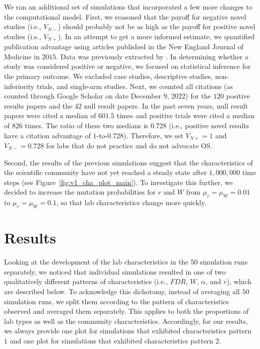 \documentclass[meta, authordate]{jote-new-article}
\begin{document}
We ran an additional set of simulations that incorporated a few more changes to the computational model. First, we reasoned that the payoff for negative novel studies (i.e., $V_{N-}$) should probably not be as high as the payoff for positive novel studies (i.e., $V_{N+}$). In an attempt to get a more informed estimate, we quantified publication advantage using articles published in the New England Journal of Medicine in $2015$. Data was previously extracted by \textcite{HoekstraMondenVanravenzwaaij_2018}. In determining whether a study was considered positive or negative, we focused on statistical inference for the primary outcome. We excluded case studies, descriptive studies, non-inferiority trials, and single-arm studies. Next, we counted all citations (as counted through Google Scholar on date December 9, 2022) for the $120$ positive results papers and the $42$ null result papers. In the past seven years, null result papers were cited a median of $601.5$ times and positive trials were cited a median of $826$ times. The ratio of these two medians is $0.728$ (i.e., positive novel results have a citation advantage of $1$-to-$0.728$). Therefore, we set $V_{N+}=1$ and $V_{N-}=0.728$ for labs that do not practice and do not advocate OS.

Second, the results of the previous simulations suggest that the characteristics of the scientific community have not yet reached a steady state after $1,000,000$ time steps (see Figure~\ref{fig:v1_cha_plot_main}). To investigate this further, we decided to increase the mutation probabilities for $r$ and $W$ from $\mu_r=\mu_W=0.01$ to $\mu_r=\mu_W=0.1$, so that lab characteristics change more quickly.

\section{Results}

Looking at the development of the lab characteristics in the $50$ simulation runs separately, we noticed that individual simulations resulted in one of two qualitatively different patterns of characteristics (i.e., $FDR$, $W$, $\alpha$, and $r$), which are described below. To acknowledge this dichotomy, instead of averaging all $50$ simulation runs, we split them according to the pattern of characteristics observed and averaged them separately. This applies to both the proportions of lab types as well as the community characteristics. Accordingly, for our results, we always provide one plot for simulations that exhibited characteristics pattern $1$ and one plot for simulations that exhibited characteristics pattern $2$.
\end{document}

